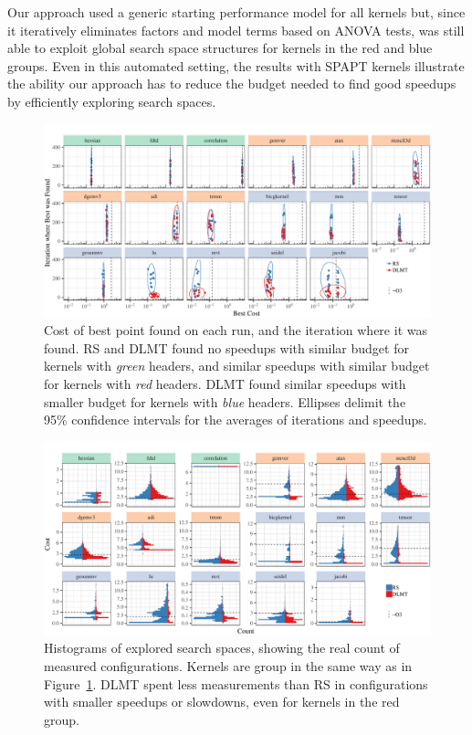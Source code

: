 \documentclass[conference]{IEEEtran}
\begin{document}
Our approach used a generic starting performance model for all kernels but,
since it iteratively eliminates factors and model terms based on ANOVA tests,
was still able to exploit global search space structures for kernels in the red
and blue groups. Even in this automated setting, the results with SPAPT kernels
illustrate the ability our approach has to reduce the budget needed to find good
speedups by efficiently exploring search spaces.

\begin{center}
\begin{figure}[p]
\centering
\includegraphics[width=\textwidth]{./img/iteration_best_comparison.pdf}
\caption{\label{fig:org50c8bf9}
Cost of best point found on each run, and the iteration where it was found. RS and DLMT found no speedups with similar budget for kernels with \emph{green} headers, and similar speedups with similar budget for kernels with \emph{red} headers. DLMT found similar speedups with smaller budget for kernels with \emph{blue} headers. Ellipses delimit the 95\% confidence intervals for the averages of iterations and speedups.}
\end{figure}
\end{center}

\begin{center}
\begin{figure}[p]
\centering
\includegraphics[width=\textwidth]{./img/split_histograms.pdf}
\caption{\label{fig:org0fe7fa6}
Histograms of explored search spaces, showing the real count of measured configurations. Kernels are group in the same way as in Figure~\ref{fig:org50c8bf9}. DLMT spent less measurements than RS in configurations with smaller speedups or slowdowns, even for kernels in the red group.}
\end{figure}
\end{center}
\end{document}
